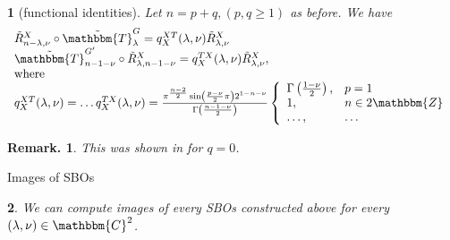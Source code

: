 \documentclass[notes,notheorems]{beamer}
\newcommand{\tmtextbf}[1]{{\bfseries{#1}}}
\newtheorem{theorem}{\translate{Theorem}}[section]
\newtheorem{theorem}{\translate{Theorem}}
\theoremstyle{definition}
\theoremstyle{example}
\theoremstyle{plain}
\theoremstyle{mystyle}
\newtheorem*{remark}{Remark.}
\begin{document}
\begin{frame}
  \begin{figure}[H]
    \centering
    \begin{subfigure}[t]{0.3\textwidth}
    \end{subfigure}
    ~ %
    \begin{subfigure}[t]{0.3\textwidth}
    \end{subfigure}
    \end{figure}
    \vspace{-1em}
	\begin{theorem}[functional identities]
	Let $n = p +
	q, (p, q \geqslant 1)$ as before. We have
	\begin{equation*}
		\begin{array}[]{l}
\tilde{R}_{n - \lambda, \nu}^X \circ
\tilde{\mathbbm{T}}_{\lambda}^G = q_X^{X T} (\lambda, \nu)
\tilde{R}^X_{\lambda, \nu} \\
\tilde{\mathbbm{T}}_{n - 1 - \nu}^{G'} \circ
\tilde{R}_{\lambda, n - 1 - \nu}^X = q_X^{T X} (\lambda, \nu)
\tilde{R}_{\lambda, \nu}^X,\\
	\mbox{where}\\
q_X^{X T} (\lambda, \nu) = \ldots
q_X^{T X} (\lambda, \nu) = \frac{\pi^{\frac{n -
2}{2}} \sin \left( \frac{p - \nu}{2} \pi \right) 2^{1 - n - \nu}}{\Gamma
\left( \frac{n - 1 - \nu}{2} \right)} \left\{ \begin{array}{ll}
  \Gamma \left( \frac{1 - \nu}{2} \right), & p = 1\\
  1, & n \in 2\mathbbm{Z}\\
  \ldots, & \ldots
\end{array} \right.
		\end{array}
	\end{equation*}
	\end{theorem}
	\begin{remark}
		This was shown in
		\cite{kobayashi2015symmetry} for $q = 0$.
	\end{remark}
\end{frame}
\begin{frame}{Images of SBOs}
	\begin{theorem}
		We can compute images
		of every SBOs constructed above for every $(\lambda, \nu) \in \mathbbm{C}^2$.
	\end{theorem}
\end{frame}
\end{document}
